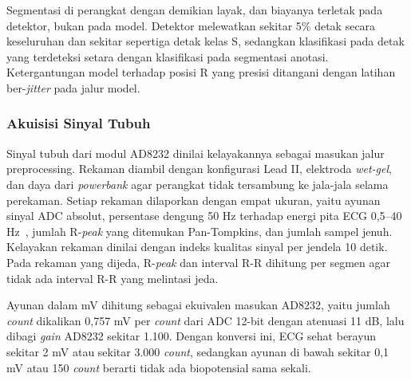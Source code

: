 Segmentasi di perangkat dengan demikian layak, dan biayanya terletak pada detektor, bukan pada model. Detektor melewatkan sekitar 5\% detak secara keseluruhan dan sekitar sepertiga detak kelas S, sedangkan klasifikasi pada detak yang terdeteksi setara dengan klasifikasi pada segmentasi anotasi. Ketergantungan model terhadap posisi R yang presisi ditangani dengan latihan ber-\textit{jitter} pada jalur model.

\subsubsection{Akuisisi Sinyal Tubuh}

Sinyal tubuh dari modul AD8232 dinilai kelayakannya sebagai masukan jalur preprocessing. Rekaman diambil dengan konfigurasi Lead II, elektroda \textit{wet-gel}, dan daya dari \textit{powerbank} agar perangkat tidak tersambung ke jala-jala selama perekaman. Setiap rekaman dilaporkan dengan empat ukuran, yaitu ayunan sinyal ADC absolut, persentase dengung 50 Hz terhadap energi pita ECG 0,5--40 Hz~\cite{gajdzik_2026}, jumlah R-\textit{peak} yang ditemukan Pan-Tompkins, dan jumlah sampel jenuh. Kelayakan rekaman dinilai dengan indeks kualitas sinyal per jendela 10 detik. Pada rekaman yang dijeda, R-\textit{peak} dan interval R-R dihitung per segmen agar tidak ada interval R-R yang melintasi jeda.

Ayunan dalam mV dihitung sebagai ekuivalen masukan AD8232, yaitu jumlah \textit{count} dikalikan 0,757 mV per \textit{count} dari ADC 12-bit dengan atenuasi 11 dB, lalu dibagi \textit{gain} AD8232 sekitar 1.100. Dengan konversi ini, ECG sehat berayun sekitar 2 mV atau sekitar 3.000 \textit{count}, sedangkan ayunan di bawah sekitar 0,1 mV atau 150 \textit{count} berarti tidak ada biopotensial sama sekali.

